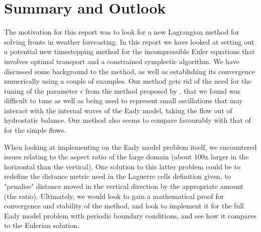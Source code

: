\documentclass[11pt, oneside]{article}   	%
\begin{document}
\section{Summary and Outlook}

The motivation for this report was to look for a new Lagrangian method for solving fronts in weather forecasting. In this report we have looked at setting out a potential new timestepping method for the incompressible Euler equations that involves optimal transport and a constrained symplectic algorithm. We have discussed some background to the method, as well as establishing its convergence numerically using a couple of examples. Our method gets rid of the need for the tuning of the parameter \(\epsilon\) from the method proposed by \cite{gallouet2016lagrangian}, that we found was difficult to tune as well as being used to represent small oscillations that may interact with the internal waves of the Eady model, taking the flow out of hydrostatic balance. Our method also seems to compare favourably with that of \cite{gallouet2016lagrangian} for the simple flows. 

When looking at implementing on the Eady model problem itself, we encountered issues relating to the aspect ratio of the large domain (about 100x larger in the horizontal than the vertical). One solution to this latter problem could be to redefine the distance metric used in the Laguerre cells definition given, to "penalise" distance moved in the vertical direction by the appropriate amount (the ratio). Ultimately, we would look to gain a mathematical proof for convergence and stability of the method, and look to implement it for the full Eady model problem with periodic boundary conditions, and see how it compares to the Eulerian solution.



\end{document}
